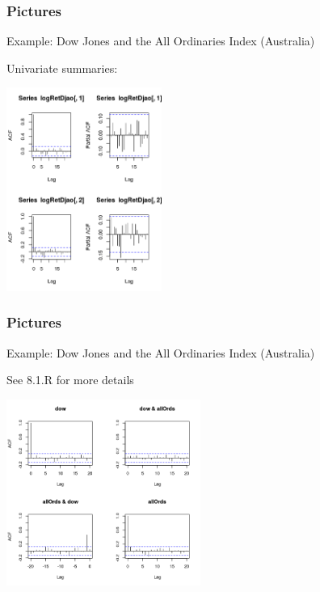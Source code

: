 \documentclass{beamer}
\begin{document}
\begin{frame}[fragile]
\frametitle{Pictures}

Example: Dow Jones and the All Ordinaries Index (Australia)
\newline

Univariate summaries:

\begin{center}
\includegraphics[width=2.00in]{./pics/Rplot02}
\end{center}



\end{frame}


\begin{frame}[fragile]
\frametitle{Pictures}

Example: Dow Jones and the All Ordinaries Index (Australia)
\newline

See 8.1.R for more details

\begin{center}
\includegraphics[width=2.50in]{./pics/Rplot03}
\end{center}



\end{frame}
\end{document}
